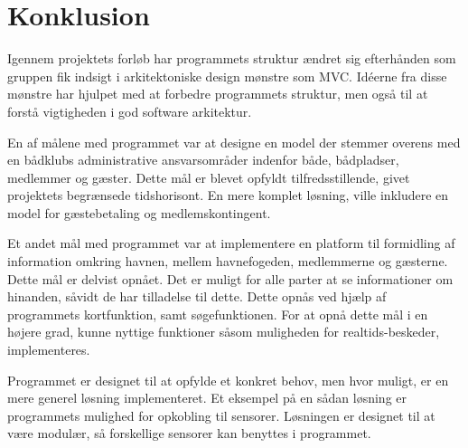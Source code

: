 \chapter{Konklusion}
\label{cha:konklusion}

Igennem projektets forløb har programmets struktur ændret sig efterhånden som gruppen fik indsigt i arkitektoniske design mønstre som MVC. Idéerne fra disse mønstre har hjulpet med at forbedre programmets struktur, men også til at forstå vigtigheden i god software arkitektur.

En af målene med programmet var at designe en model der stemmer overens med en bådklubs administrative ansvarsområder indenfor både, bådpladser, medlemmer og gæster. Dette mål er blevet opfyldt tilfredsstillende, givet projektets begrænsede tidshorisont. En mere komplet løsning, ville inkludere en model for gæstebetaling og medlemskontingent.

Et andet mål med programmet var at implementere en platform til formidling af information omkring havnen, mellem havnefogeden, medlemmerne og gæsterne. Dette mål er delvist opnået. Det er muligt for alle parter at se informationer om hinanden, såvidt de har tilladelse til dette. Dette opnås ved hjælp af programmets kortfunktion, samt søgefunktionen. For at opnå dette mål i en højere grad, kunne nyttige funktioner såsom muligheden for realtids-beskeder, implementeres.

Programmet er designet til at opfylde et konkret behov, men hvor muligt, er en mere generel løsning implementeret. Et eksempel på en sådan løsning er programmets mulighed for opkobling til sensorer. Løsningen er designet til at være modulær, så forskellige sensorer kan benyttes i programmet.
